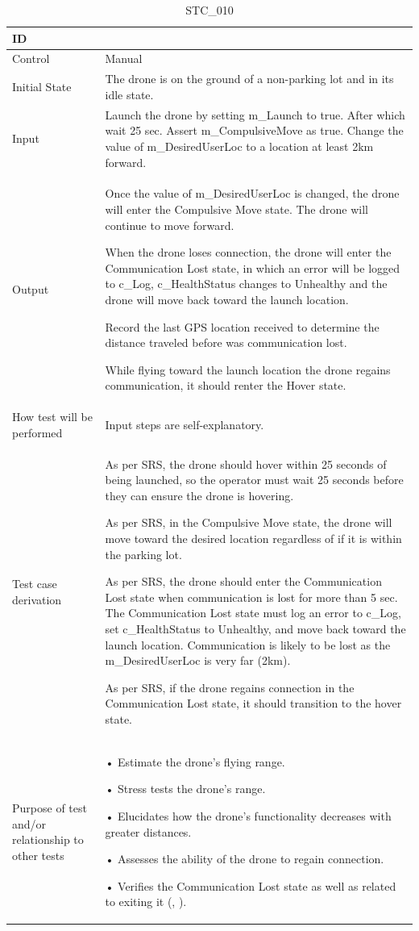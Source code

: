 \documentclass[12pt, titlepage]{article}
\begin{document}
\begin{table}[!h]
\begin{center}
\caption {STC\_010}
\label{tab:STC_010}
\begin{tabular}{ | m{3.2cm} | m{12.2cm} | } 
\hline
ID & \nameref{tab:STC_010} \\ 
\hline
Control & Manual \\ 
\hline
Initial State & The drone is on the ground of a non-parking lot and in its idle state. \\ 
\hline
Input & Launch the drone by setting m_Launch to true. After which wait 25 sec.  Assert m_CompulsiveMove as true. Change the value of m_DesiredUserLoc to a location at least 2km forward. \\ 
\hline
Output & Once the value of m_DesiredUserLoc is changed, the drone will enter the Compulsive Move state. The drone will continue to move forward. 

When the drone loses connection, the drone will enter the Communication Lost state, in which an error will be logged to c_Log, c_HealthStatus changes to Unhealthy and the drone will move back toward the launch location. 

Record the last GPS location received to determine the distance traveled before was communication lost. 

While flying toward the launch location the drone regains communication, it should renter the Hover state. \\ 
\hline
How test will be performed & Input steps are self-explanatory. \\ 
\hline
Test case derivation & As per SRS, the drone should hover within 25 seconds of being launched, so the operator must wait 25 seconds before they can ensure the drone is hovering. 

As per SRS, in the Compulsive Move state, the drone will move toward the desired location regardless of if it is within the parking lot.

As per SRS, the drone should enter the Communication Lost state when communication is lost for more than 5 sec. The Communication Lost state must log an error to c_Log, set c_HealthStatus to Unhealthy, and move back toward the launch location. Communication is likely to be lost as the m_DesiredUserLoc is very far (2km).

As per SRS, if the drone regains connection in the Communication Lost state, it should transition to the hover state.
 \\ 
\hline
Purpose of test and/or relationship to other tests & • Estimate the drone's flying range.

• Stress tests the drone's range.

• Elucidates how the drone's functionality decreases with greater distances. 

• Assesses the ability of the drone to regain connection.

• Verifies the Communication Lost state as well as related to exiting it (\nameref{STA_010}, \nameref{TRANS_010}). 

\\ 
\hline
\end{tabular}
\end{center}
\end{table}
\end{document}
